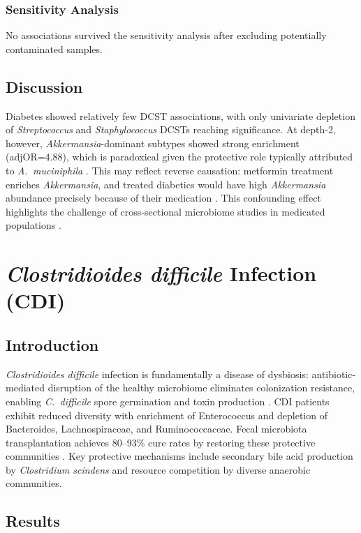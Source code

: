 \documentclass[11pt,a4paper]{article}
\begin{document}
\subsubsection{Sensitivity Analysis}
No associations survived the sensitivity analysis after excluding potentially contaminated samples.

\subsection{Discussion}
Diabetes showed relatively few DCST associations, with only univariate depletion of \textit{Streptococcus} and \textit{Staphylococcus} DCSTs reaching significance. At depth-2, however, \textit{Akkermansia}-dominant subtypes showed strong enrichment (adjOR=4.88), which is paradoxical given the protective role typically attributed to \textit{A.\ muciniphila} \cite{Everard2013_Akkermansia,Forslund2015_metformin}. This may reflect reverse causation: metformin treatment enriches \textit{Akkermansia}, and treated diabetics would have high \textit{Akkermansia} abundance precisely because of their medication \cite{Forslund2015_metformin}. This confounding effect highlights the challenge of cross-sectional microbiome studies in medicated populations \cite{Qin2012_T2D}.
\newpage

\section{\textit{Clostridioides difficile} Infection (CDI)}
\subsection{Introduction}
\textit{Clostridioides difficile} infection is fundamentally a disease of dysbiosis: antibiotic-mediated disruption of the healthy microbiome eliminates colonization resistance, enabling \textit{C.\ difficile} spore germination and toxin production \cite{Sehgal2021_CDI,Schubert2014_CDI}. CDI patients exhibit reduced diversity with enrichment of Enterococcus and depletion of Bacteroides, Lachnospiraceae, and Ruminococcaceae. Fecal microbiota transplantation achieves 80--93\% cure rates by restoring these protective communities \cite{Seekatz2014_FMT}. Key protective mechanisms include secondary bile acid production by \textit{Clostridium scindens} and resource competition by diverse anaerobic communities.

\subsection{Results}
\end{document}
